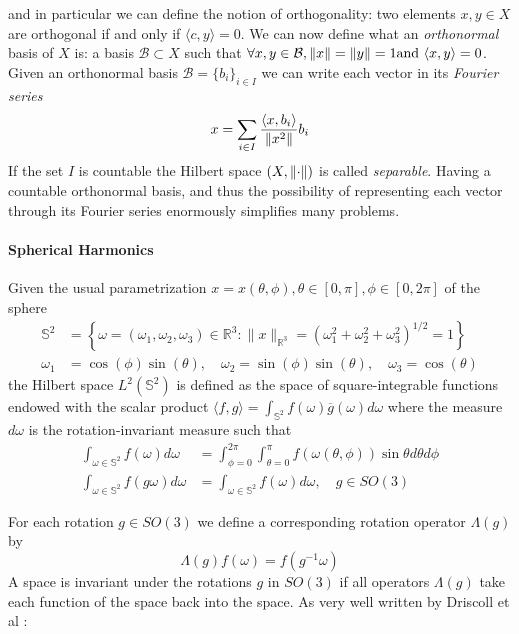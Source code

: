 and in particular we can define the notion of orthogonality: two elements  $x, y \in X$ are orthogonal if and only if $\langle c, y\rangle=0$. We can now define what an \textit{orthonormal} basis of $X$ is: a basis $\mathcal B \subset X$ such that $\forall x, y \in \mathcal B, \left\lVert x\right\rVert = \left\lVert y\right\rVert = 1 \text{and } \langle x, y\rangle = 0$. Given an orthonormal basis $\mathcal B = \{b_i\}_{i\in I}$ we can write each vector in its \textit{Fourier series} 
\begin{equation}\label{eq:abstract fourier}
x = \sum_{i\in I} \frac{\langle x, b_i\rangle}{\left\lVert x^2\right\rVert}b_i
\end{equation}
If the set $I$ is countable the Hilbert space $(X, \left\lVert\cdot\right\rVert)$ is called \textit{separable}. Having a countable orthonormal basis, and thus the possibility of representing each vector through its Fourier series enormously simplifies many problems.
\paragraph{Spherical Harmonics}
 Given the usual parametrization $x = x(\theta, \phi), \theta\in[0,\pi], \phi\in[0,2\pi]$ of the sphere
\begin{align*}
\mathbb{S}^{2}&=\left\{\omega=\left(\omega_{1}, \omega_{2}, \omega_{3}\right) \in \mathbb{R}^{3} :\|x\|_{\mathbb{R}^{3}}=\left(\omega_{1}^{2}+\omega_{2}^{2}+\omega_{3}^{2}\right)^{1 / 2}=1\right\}\\
\omega_{1}&=\cos (\phi) \sin (\theta), \quad \omega_{2}=\sin (\phi) \sin (\theta), \quad \omega_{3}=\cos (\theta)
\end{align*}
the Hilbert space $L^2(\mathbb S^2)$ is defined as the space of square-integrable functions endowed with the scalar product $\langle f,g\rangle=\int_{\mathbb S^2}f(\omega)\overline g(\omega)d\omega$ where the measure $d\omega$ is the rotation-invariant measure such that
\begin{align}
\int_{\omega \in \mathbb S^{2}} f(\omega) d \omega&=\int_{\phi=0}^{2 \pi} \int_{\theta=0}^{\pi} f(\omega(\theta, \phi)) \sin \theta d \theta d \phi\\
\int_{\omega \in \mathbb S^{2}} f(g \omega) d \omega&=\int_{\omega \in \mathbb S^{2}} f(\omega) d \omega, \quad g \in S O(3)
\end{align}

For each rotation $g\in SO(3)$ we define a corresponding rotation operator $\Lambda(g)$ by
$$
\Lambda(g) f(\omega)=f\left(g^{-1} \omega\right)
$$
A space is invariant under the rotations $g$ in $SO(3)$ if all operators $\Lambda(g)$ take each function of the space back into the space. As very well written by Driscoll et al \cite{Driscoll:1994:CFT:184069.184073}:

